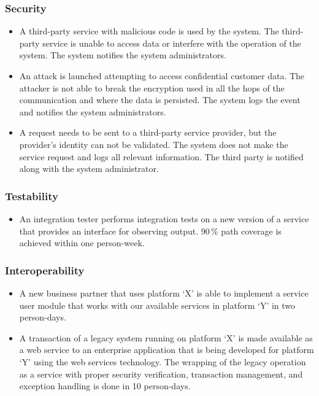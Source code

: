 \subsubsection{Security}
\begin{itemize}
    \item A third-party service with malicious code is used by the system. The third-party service is unable to access data or interfere with the operation of the system. The system notifies the system administrators. 
    \item An attack is launched attempting to access confidential customer data. The attacker is not able to break the encryption used in all the hops of the communication and where the data is persisted. The system logs the event and notifies the system administrators. 
    \item A request needs to be sent to a third-party service provider, but the provider’s identity can not be validated. The system does not make the service request and logs all relevant information. The third party is notified along with the system administrator. 
\end{itemize}

\subsubsection{Testability}
\begin{itemize}
    \item An integration tester performs integration tests on a new version of a service that provides an interface for observing output. 90\,\% path coverage is achieved within one person-week. 
\end{itemize}

\subsubsection{Interoperability}
\begin{itemize}
    \item A new business partner that uses platform ‘X’ is able to implement a service user module that works with our available services in platform ‘Y’ in two person-days.  
    \item A transaction of a legacy system running on platform ‘X’ is made available as a web service to an enterprise application that is being developed for platform ‘Y’ using the web services technology. The wrapping of the legacy operation as a service with proper security verification, transaction management, and exception handling is done in 10 person-days. 
\end{itemize}

